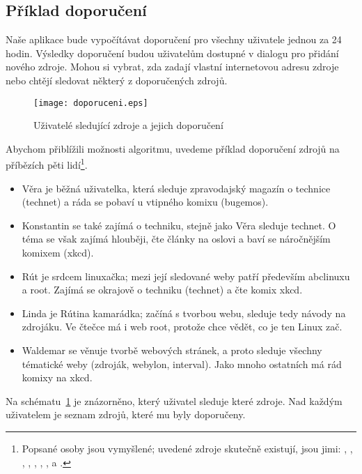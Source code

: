 \subsection{Příklad doporučení}

Naše aplikace bude vypočítávat doporučení pro všechny uživatele jednou za 24 hodin.
Výsledky doporučení budou uživatelům dostupné v dialogu pro přidání nového zdroje.
Mohou si vybrat, zda zadají vlastní internetovou adresu zdroje nebo chtějí sledovat některý z doporučených zdrojů.

\begin{figure}
    \centering
    \texttt{[image: doporuceni.eps]}
    \caption{Uživatelé sledující zdroje a jejich doporučení}
    \label{fig:doporuceni}
\end{figure}

Abychom přiblížili možnosti algoritmu, uvedeme příklad doporučení zdrojů na příbězích pěti lidí\footnote{
\raggedright
Popsané osoby jsou vymyšlené; uvedené zdroje skutečně existují, jsou jimi:
, ,
, , 
, ,
,  a
.
}.

\begin{itemize}
	\item Věra je běžná uživatelka, která sleduje zpravodajský magazín o technice (technet) a ráda se pobaví u vtipného komixu (bugemos).
	\item Konstantin se také zajímá o techniku, stejně jako Věra sleduje technet.
		O téma se však zajímá hlouběji, čte články na oslovi a baví se náročnějším komixem (xkcd).
	\item Rút je srdcem linuxačka; mezi její sledované weby patří především abclinuxu a root.
		Zajímá se okrajově o techniku (technet) a čte komix xkcd.
	\item Linda je Rútina kamarádka; začíná s tvorbou webu, sleduje tedy návody na zdrojáku.
		Ve čtečce má i web root, protože chce vědět, co je ten Linux zač.
	\item Waldemar se věnuje tvorbě webových stránek, a proto sleduje všechny tématické weby (zdroják, webylon, interval).
		Jako mnoho ostatních má rád komixy na xkcd.
\end{itemize}

Na schématu~\ref{fig:doporuceni} je znázorněno, který uživatel sleduje které zdroje.
Nad každým uživatelem je seznam zdrojů, které mu byly doporučeny.


